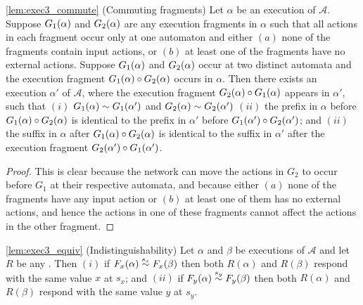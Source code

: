 \begin{lemma*}\ref{lem:exec3_commute} (Commuting fragments) 
  Let $\alpha$ be an execution of $\mathcal{A}$. Suppose $\frage{G_1}{\alpha}{}$ and $\frage{G_2}{\alpha}{}$ are any  execution fragments in $\alpha$ such that
  all actions in each fragment occur only at one automaton and  either $(a)$ none of the fragments contain input actions, or $(b)$ 
  at least one of the fragments have no external actions. Suppose $\frage{G_1}{\alpha}{}$ 
  and $\frage{G_2}{\alpha}{}$  occur at two distinct automata and the execution
  fragment $\frage{G_1}{\alpha}{}\circ \frage{G_2}{\alpha}{}$ occurs in $\alpha$.
  Then there exists an execution $\alpha'$ of $\mathcal{A}$, where  the execution fragment  $\frage{G_2}{\alpha}{}\circ \frage{G_1}{\alpha}{}$ appears in $\alpha'$, such that 
  $(i)$  $\frage{G_1}{\alpha}{} \sim \frage{G_1}{\alpha'}{}$ and  $\frage{G_2}{\alpha}{} \sim \frage{G_2}{\alpha'}{}$
  $(ii)$ 
the prefix  in $\alpha$  before  $\frage{G_1}{\alpha}{} \circ \frage{G_2}{\alpha}{}$
 is identical to the prefix  in $\alpha'$ before  $\frage{G_1}{\alpha'}{} \circ \frage{G_2}{\alpha'}{}$; and $(ii)$ 
the suffix in $\alpha$  after   
 $\frage{G_1}{\alpha}{} \circ \frage{G_2}{\alpha}{}$
is identical to the suffix in $\alpha'$ after the execution fragment 
 $\frage{G_2}{\alpha'}{} \circ \frage{G_1}{\alpha'}{}$. 
  \end{lemma*}

\begin{proof}
  This is clear because the network can move the actions in $G_2$ to occur before $G_1$ at their respective automata, and  because 
   either $(a)$ none of the fragments have any input action or $(b)$ at least one of them has no external actions, and hence 
  the actions in one of these fragments cannot affect the actions in the other fragment.
\end{proof}

\begin{lemma*}\ref{lem:exec3_equiv} (Indistinguishability)  
Let $\alpha$ and $\beta$ be executions of $\mathcal{A}$ and let $R$ be any \rot{}. Then 
$(i)$  if $\frage{F_{x}}{\alpha}{} \stackrel{s_x}{\sim}\frage{F_{x}}{\beta}{}$ then both 
$R(\alpha)$ and $R(\beta)$ respond with the same value $x$ at $s_x$; and 
$(ii)$ if  $\frage{F_{y}}{\alpha}{} \stackrel{s_y}{\sim}\frage{F_{y}}{\beta}{}$ then both 
$R(\alpha)$ and $R(\beta)$ respond with the same value $y$ at $s_y$.
\end{lemma*}

